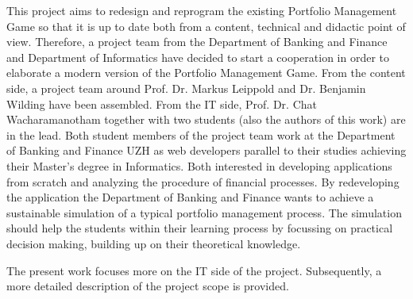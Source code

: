 This project aims to redesign and reprogram the existing Portfolio Management Game so that it is up to date both from a content, technical and didactic point of view. Therefore, a project team from the Department of Banking and Finance and Department of Informatics have decided to start a cooperation in order to elaborate a modern version of the Portfolio Management Game. From the content side, a project team around Prof. Dr. Markus Leippold and Dr. Benjamin Wilding have been assembled. From the IT side, Prof. Dr. Chat Wacharamanotham together with two students (also the authors of this work) are in the lead. Both student members of the project team work at the Department of Banking and Finance UZH as web developers parallel to their studies achieving their Master’s degree in Informatics. Both interested in developing applications from scratch and analyzing the procedure of financial processes. By redeveloping the application the Department of Banking and Finance wants to achieve a sustainable simulation of a typical portfolio management process. The simulation should help the students within their learning process by focussing on practical decision making, building up on their theoretical knowledge. 

The present work focuses more on the IT side of the project. Subsequently, a more detailed description of the project scope is provided.
